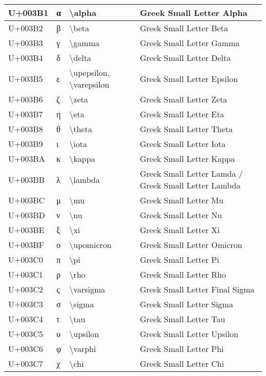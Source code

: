 \begin{table}[h]
\begin{tabulary}{\linewidth}{|L|L|L|L|}
\hline
U+003B1 & α & {\textbackslash}alpha & Greek Small Letter Alpha \\
\hline
U+003B2 & β & {\textbackslash}beta & Greek Small Letter Beta \\
\hline
U+003B3 & γ & {\textbackslash}gamma & Greek Small Letter Gamma \\
\hline
U+003B4 & δ & {\textbackslash}delta & Greek Small Letter Delta \\
\hline
U+003B5 & ε & {\textbackslash}upepsilon, {\textbackslash}varepsilon & Greek Small Letter Epsilon \\
\hline
U+003B6 & ζ & {\textbackslash}zeta & Greek Small Letter Zeta \\
\hline
U+003B7 & η & {\textbackslash}eta & Greek Small Letter Eta \\
\hline
U+003B8 & θ & {\textbackslash}theta & Greek Small Letter Theta \\
\hline
U+003B9 & ι & {\textbackslash}iota & Greek Small Letter Iota \\
\hline
U+003BA & κ & {\textbackslash}kappa & Greek Small Letter Kappa \\
\hline
U+003BB & λ & {\textbackslash}lambda & Greek Small Letter Lamda / Greek Small Letter Lambda \\
\hline
U+003BC & μ & {\textbackslash}mu & Greek Small Letter Mu \\
\hline
U+003BD & ν & {\textbackslash}nu & Greek Small Letter Nu \\
\hline
U+003BE & ξ & {\textbackslash}xi & Greek Small Letter Xi \\
\hline
U+003BF & ο & {\textbackslash}upomicron & Greek Small Letter Omicron \\
\hline
U+003C0 & π & {\textbackslash}pi & Greek Small Letter Pi \\
\hline
U+003C1 & ρ & {\textbackslash}rho & Greek Small Letter Rho \\
\hline
U+003C2 & ς & {\textbackslash}varsigma & Greek Small Letter Final Sigma \\
\hline
U+003C3 & σ & {\textbackslash}sigma & Greek Small Letter Sigma \\
\hline
U+003C4 & τ & {\textbackslash}tau & Greek Small Letter Tau \\
\hline
U+003C5 & υ & {\textbackslash}upsilon & Greek Small Letter Upsilon \\
\hline
U+003C6 & φ & {\textbackslash}varphi & Greek Small Letter Phi \\
\hline
U+003C7 & χ & {\textbackslash}chi & Greek Small Letter Chi \\

\end{tabulary}
\end{table}
